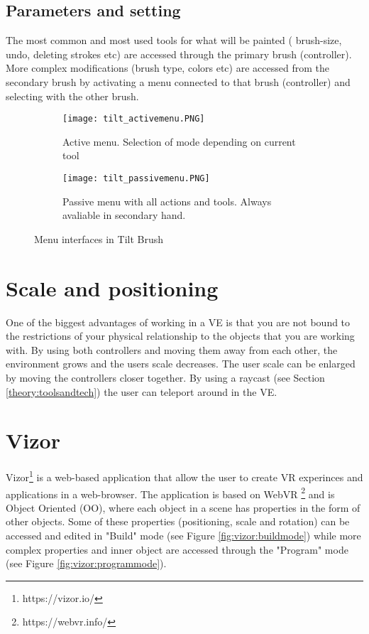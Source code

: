 \subsection{Parameters and setting}
The most common and most used tools for what will be painted ( brush-size, undo, deleting strokes etc) are accessed through the primary brush (controller). More complex modifications (brush type, colors etc) are accessed from the secondary brush by activating a menu connected to that brush (controller) and selecting with the other brush.
\begin{figure}
\begin{subfigure}{.5\textwidth}
  \centering
  \texttt{[image: tilt\_activemenu.PNG]}
  \caption{Active menu. Selection of mode depending on current tool}
  \label{fig:tilt:activemenu}
\end{subfigure}%
\begin{subfigure}{.5\textwidth}
  \centering
  \texttt{[image: tilt\_passivemenu.PNG]}
  \caption{Passive menu with all actions and tools. Always avaliable in secondary hand. }
  \label{fig:tilt:activemenu}
\end{subfigure}
\caption{Menu interfaces in Tilt Brush}
\label{fig:tilt}
\end{figure}
\section{Scale and positioning}
One of the biggest advantages of working in a VE is that you are not bound to the restrictions of your physical relationship to the objects that you are working with. By using both controllers and moving them away from each other, the environment grows and the users scale decreases. The user scale can be enlarged by moving the controllers closer together.
By using a raycast (see Section \ref{theory:toolsandtech}) the user can teleport around in the VE.

\section{Vizor}
Vizor\footnote{https://vizor.io/} is a web-based application that allow the user to create VR experinces and applications in a web-browser. The application is based on WebVR \footnote{https://webvr.info/} and is Object Oriented (OO), where each object in a scene has properties in the form of other objects. Some of these properties (positioning, scale and rotation) can be accessed and edited in "Build" mode (see Figure \ref{fig:vizor:buildmode}) while more complex properties and inner object are accessed through the "Program" mode (see Figure \ref{fig:vizor:programmode}).

